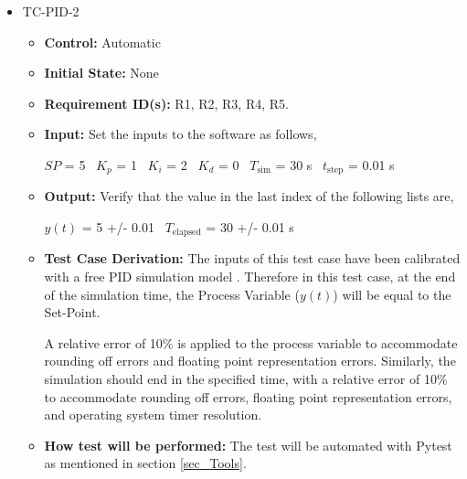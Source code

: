 \documentclass[12pt, titlepage]{article}
\begin{document}
\begin{itemize}
\item{TC-PID-2\\}
\begin{itemize}

\item{\textbf{Control:}} Automatic
					
\item{\textbf{Initial State:}} None

\item{\textbf{Requirement ID(s):}}  R1, R2, R3, R4, R5.
					
\item{\textbf{Input:}} Set the inputs to the software as follows,

$SP$ = 5
~\newline$K_p$ = 1
~\newline$K_i$ = 2
~\newline$K_d$ = 0
~\newline$T_\text{sim}$ = 30 s
~\newline$t_\text{step}$ = 0.01 s
					
\item{\textbf{Output:}}  Verify that the value in the last index of the following lists are,

$y(t)$ =  5 +/- 0.01
~\newline$T_\text{elapsed}$  = 30 +/- 0.01 s

\item{\textbf{Test Case Derivation:}}  The inputs of this test case have been calibrated 
with a free PID simulation model \cite{Free_PID}. Therefore in this test case, at the end 
of the simulation time, the Process Variable ($y(t)$) will be equal to the Set-Point. 

A relative error of 10\% is applied to the process variable to accommodate rounding off errors 
and floating point representation errors. Similarly, the simulation should end in the specified time, 
with a relative error of 10\% to accommodate rounding off errors, floating point representation errors, and
 operating system timer resolution.


\item{\textbf{How test will be performed:}}  The test will be automated with Pytest as mentioned in 
section \ref{sec_Tools}.

\end{itemize}
\end{itemize}
\end{document}
